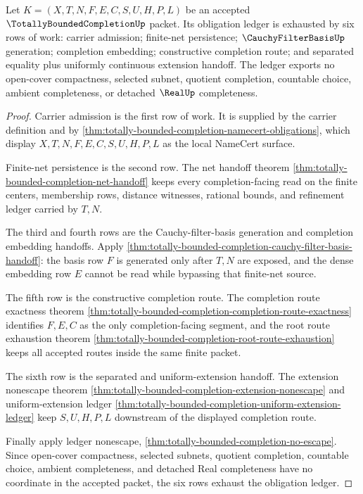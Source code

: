 \begin{theorem}
\label{thm:totally-bounded-completion-obligation-ledger}
Let $K=(X,T,N,F,E,C,S,U,H,P,L)$ be an accepted $\TotallyBoundedCompletionUp$ packet. Its obligation ledger is exhausted by six rows of work: carrier admission; finite-net persistence; $\CauchyFilterBasisUp$ generation; completion embedding; constructive completion route; and separated equality plus uniformly continuous extension handoff. The ledger exports no open-cover compactness, selected subnet, quotient completion, countable choice, ambient completeness, or detached $\RealUp$ completeness.
\end{theorem}
\begin{proof}
Carrier admission is the first row of work. It is supplied by the carrier definition and by \autoref{thm:totally-bounded-completion-namecert-obligations}, which display $X,T,N,F,E,C,S,U,H,P,L$ as the local NameCert surface.

Finite-net persistence is the second row. The net handoff theorem \autoref{thm:totally-bounded-completion-net-handoff} keeps every completion-facing read on the finite centers, membership rows, distance witnesses, rational bounds, and refinement ledger carried by $T,N$.

The third and fourth rows are the Cauchy-filter-basis generation and completion embedding handoffs. Apply \autoref{thm:totally-bounded-completion-cauchy-filter-basis-handoff}: the basis row $F$ is generated only after $T,N$ are exposed, and the dense embedding row $E$ cannot be read while bypassing that finite-net source.

The fifth row is the constructive completion route. The completion route exactness theorem \autoref{thm:totally-bounded-completion-completion-route-exactness} identifies $F,E,C$ as the only completion-facing segment, and the root route exhaustion theorem \autoref{thm:totally-bounded-completion-root-route-exhaustion} keeps all accepted routes inside the same finite packet.

The sixth row is the separated and uniform-extension handoff. The extension nonescape theorem \autoref{thm:totally-bounded-completion-extension-nonescape} and uniform-extension ledger \autoref{thm:totally-bounded-completion-uniform-extension-ledger} keep $S,U,H,P,L$ downstream of the displayed completion route.

Finally apply ledger nonescape, \autoref{thm:totally-bounded-completion-no-escape}. Since open-cover compactness, selected subnets, quotient completion, countable choice, ambient completeness, and detached Real completeness have no coordinate in the accepted packet, the six rows exhaust the obligation ledger.
\end{proof}

